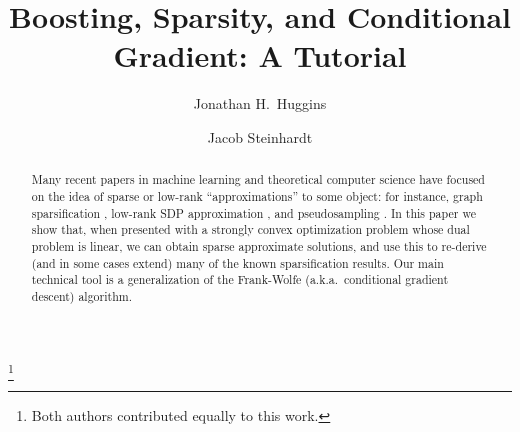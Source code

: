 \documentclass[reqno,oneside,a4paper]{amsart}
\begin{document}
 

\title{Boosting, Sparsity, and Conditional Gradient: A Tutorial}
	   
\thanks{Both authors contributed equally to this work.}

\author[J.~H.~Huggins]{Jonathan H.~Huggins}
\address{Massachusetts Institute of Technology}

\author[J.~Steinhardt]{Jacob Steinhardt}
\address{Stanford University}


\begin{abstract} 
Many recent papers in machine learning and theoretical computer science have 
focused on the idea of sparse or low-rank ``approximations'' to some object: 
for instance, graph sparsification \citep{deCarliSilva:2011}, low-rank SDP approximation \citep{Arora:2007}, 
and pseudosampling \citep{Welling:2009a,Chen:2010a}. In this paper we show that, when presented with 
a strongly convex optimization problem whose dual problem is linear, we can obtain 
sparse approximate solutions, and use this to re-derive (and in some cases 
extend) many of the known sparsification results. Our main technical tool
is a generalization of the Frank-Wolfe (a.k.a.\ conditional gradient 
descent) algorithm. 
\end{abstract} 

\maketitle










\end{document}
